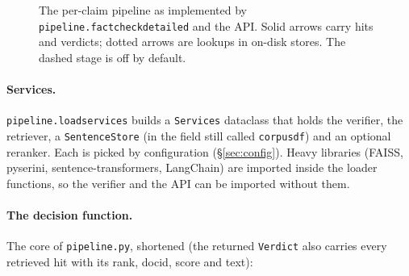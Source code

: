 \documentclass[11pt,a4paper]{article}
\makeatletter
\DeclareRobustCommand{\_}{\ifmmode\nfss@text{\textunderscore}\else\textunderscore\allowbreak\fi}
\newcommand{\file}[1]{\texttt{#1}}
\makeatother
\begin{document}
\begin{figure}[ht]
\caption{The per-claim pipeline as implemented by \texttt{pipeline.fact\_check\_detailed} and the API. Solid arrows
carry hits and verdicts; dotted arrows are lookups in on-disk stores. The dashed stage is off by default.}
\label{fig:pipeline}
\end{figure}

\paragraph{Services.} \file{pipeline.load\_services} builds a \texttt{Services} dataclass that holds the verifier, the
retriever, a \texttt{SentenceStore} (in the field still called \texttt{corpus\_df}) and an optional reranker. Each is
picked by configuration (\S\ref{sec:config}). Heavy libraries (FAISS, pyserini, sentence-transformers,
LangChain) are imported inside the loader functions, so the verifier and the API can be imported without them.

\paragraph{The decision function.} The core of \file{pipeline.py}, shortened (the returned \texttt{Verdict} also
carries every retrieved hit with its rank, docid, score and text):
\end{document}
